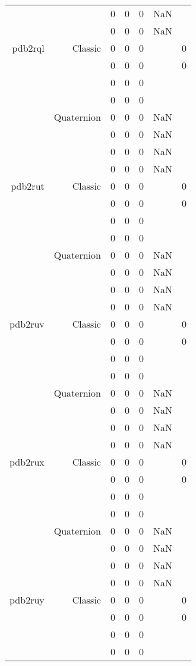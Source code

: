 \begin{xltabular}{\textwidth}{r|rcccSc}
& & 0 & 0 & 0 & NaN & \\
& & 0 & 0 & 0 & NaN & \\ \addlinespace
pdb2rql & Classic & 0 & 0 & 0 & & 0 \\
& & 0 & 0 & 0 & & 0 \\
& & 0 & 0 & 0 & & \\
& & 0 & 0 & 0 & & \\
& Quaternion & 0 & 0 & 0 & NaN & \\
& & 0 & 0 & 0 & NaN & \\
& & 0 & 0 & 0 & NaN & \\
& & 0 & 0 & 0 & NaN & \\ \addlinespace
pdb2rut & Classic & 0 & 0 & 0 & & 0 \\
& & 0 & 0 & 0 & & 0 \\
& & 0 & 0 & 0 & & \\
& & 0 & 0 & 0 & & \\
& Quaternion & 0 & 0 & 0 & NaN & \\
& & 0 & 0 & 0 & NaN & \\
& & 0 & 0 & 0 & NaN & \\
& & 0 & 0 & 0 & NaN & \\ \addlinespace
pdb2ruv & Classic & 0 & 0 & 0 & & 0 \\
& & 0 & 0 & 0 & & 0 \\
& & 0 & 0 & 0 & & \\
& & 0 & 0 & 0 & & \\
& Quaternion & 0 & 0 & 0 & NaN & \\
& & 0 & 0 & 0 & NaN & \\
& & 0 & 0 & 0 & NaN & \\
& & 0 & 0 & 0 & NaN & \\ \addlinespace
pdb2rux & Classic & 0 & 0 & 0 & & 0 \\
& & 0 & 0 & 0 & & 0 \\
& & 0 & 0 & 0 & & \\
& & 0 & 0 & 0 & & \\
& Quaternion & 0 & 0 & 0 & NaN & \\
& & 0 & 0 & 0 & NaN & \\
& & 0 & 0 & 0 & NaN & \\
& & 0 & 0 & 0 & NaN & \\ \addlinespace
pdb2ruy & Classic & 0 & 0 & 0 & & 0 \\
& & 0 & 0 & 0 & & 0 \\
& & 0 & 0 & 0 & & \\
& & 0 & 0 & 0 & & \\

\end{xltabular}
